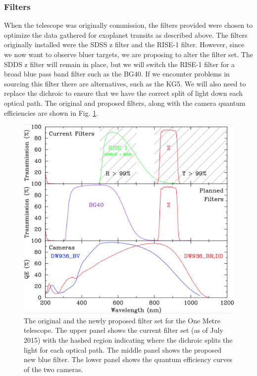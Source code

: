 \documentclass[a4paper,fleqn,usenatbib]{mnras}
\begin{document}
\subsubsection{Filters}
When the telescope was originally commission, the filters provided were chosen to optimize the data gathered for exoplanet transits as described above. The filters originally installed were the SDSS z filter and the RISE-1 filter. However, since we now want to observe bluer targets, we are proposing to alter the filter set. The SDDS z filter will remain in place, but we will switch the RISE-1 filter for a broad blue pass band filter such as the BG40. If we encounter problems in sourcing this filter there are alternatives, such as the KG5. We will also need to replace the dichroic to ensure that we have the correct split of light down each optical path.  The original and proposed filters, along with the camera quantum efficiencies are shown in Fig. \ref{fig:filters}.

\begin{figure}
	\includegraphics[width=\columnwidth]{images/filters.png}
    \caption{The original and the newly proposed filter set for the One Metre telescope. The upper panel shows the current filter set (as of July 2015) with the hashed region indicating where the dichroic splits the light for each optical path. The middle panel shows the proposed new blue filter. The lower panel shows the quantum efficiency curves of the two cameras. }
    \label{fig:filters}
\end{figure}
\end{document}
